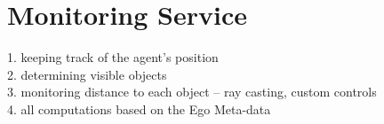 \section{Monitoring Service} %
\label{sec:monitoring_service}

1. keeping track of the agent's position\\
2. determining visible objects\\
3. monitoring distance to each object -- ray casting, custom controls\\

4. all computations based on the Ego Meta-data

